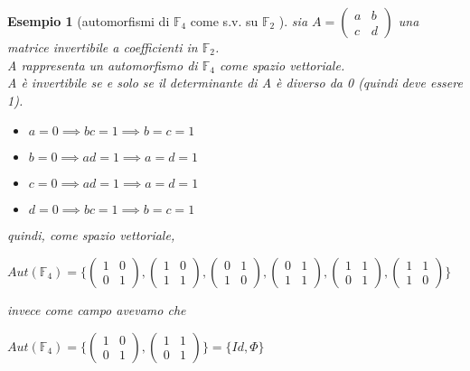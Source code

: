 \documentclass[a4paper,12pt]{article}
\theoremstyle{def}
\theoremstyle{prop}
\theoremstyle{esempio}
\newtheorem*{example}{Esempio}
\theoremstyle{dimostrazione}
\theoremstyle{teo}
\theoremstyle{osservazione}
\begin{document}
\begin{example}[automorfismi di \(\mathbb{F}_4\) come s.v. su \(\mathbb{F}_2\) ]
	sia \(A = \begin{pmatrix}
		a & b \\
		c & d
	\end{pmatrix}\) una matrice invertibile a coefficienti in \(\mathbb{F}_2\).\\
	A rappresenta un automorfismo di \(\mathbb{F}_4\) come spazio vettoriale.\\
	A è invertibile se e solo se il determinante di A è diverso da 0 (quindi deve essere 1).\\
	\begin{itemize}
		\item \(a = 0 \implies bc = 1 \implies b = c = 1\)
		\item \(b = 0 \implies ad = 1 \implies a = d = 1\)
		\item \(c = 0 \implies ad = 1 \implies a = d = 1\)
		\item \(d = 0 \implies bc = 1 \implies b = c = 1\)
	\end{itemize}
	quindi, come spazio vettoriale,
	\begin{center}
		\(Aut(\mathbb{F}_4) = \{
		\begin{pmatrix}
			1 & 0 \\
			0 & 1
		\end{pmatrix},
		\begin{pmatrix}
			1 & 0 \\
			1 & 1
		\end{pmatrix},
		\begin{pmatrix}
			0 & 1 \\
			1 & 0
		\end{pmatrix},
		\begin{pmatrix}
			0 & 1 \\
			1 & 1
		\end{pmatrix},
		\begin{pmatrix}
			1 & 1 \\
			0 & 1
		\end{pmatrix},
		\begin{pmatrix}
			1 & 1 \\
			1 & 0
		\end{pmatrix}
		\}\)
	\end{center}
	invece come campo avevamo che
	\begin{center}
		\(Aut(\mathbb{F}_4) = \{
		\begin{pmatrix}
			1 & 0 \\
			0 & 1
		\end{pmatrix},
		\begin{pmatrix}
			1 & 1 \\
			0 & 1
		\end{pmatrix}\} = \{Id, \Phi\}\)
	\end{center}
\end{example}
\end{document}
